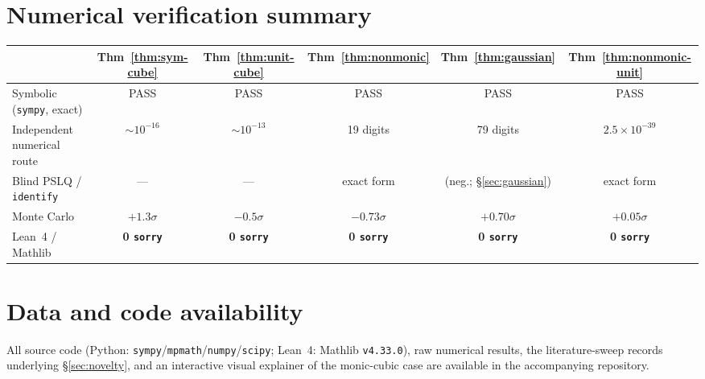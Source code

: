 \documentclass[11pt,reqno]{amsart}
\theoremstyle{plain}
\theoremstyle{remark}
\begin{document}
\appendix
\section{Numerical verification summary}

\begin{center}
\renewcommand{\arraystretch}{1.3}
\begin{tabular}{lccccc}
\hline
 & Thm~\ref{thm:sym-cube} & Thm~\ref{thm:unit-cube} & Thm~\ref{thm:nonmonic} & Thm~\ref{thm:gaussian} & Thm~\ref{thm:nonmonic-unit} \\
\hline
Symbolic (\texttt{sympy}, exact) & PASS & PASS & PASS & PASS & PASS \\
Independent numerical route & $\sim10^{-16}$ & $\sim10^{-13}$ & 19 digits & 79 digits & $2.5{\times}10^{-39}$ \\
Blind PSLQ / \texttt{identify} & --- & --- & exact form & (neg.; \S\ref{sec:gaussian}) & exact form \\
Monte Carlo & $+1.3\sigma$ & $-0.5\sigma$ & $-0.73\sigma$ & $+0.70\sigma$ & $+0.05\sigma$ \\
Lean~4 / Mathlib & \textbf{0 \texttt{sorry}} & \textbf{0 \texttt{sorry}} & \textbf{0 \texttt{sorry}} & \textbf{0 \texttt{sorry}} & \textbf{0 \texttt{sorry}} \\
\hline
\end{tabular}
\end{center}

\section*{Data and code availability}
All source code (Python: \texttt{sympy}/\texttt{mpmath}/\texttt{numpy}/\texttt{scipy};
Lean~4: Mathlib \texttt{v4.33.0}), raw numerical results, the literature-sweep
records underlying \S\ref{sec:novelty}, and an interactive visual explainer of
the monic-cubic case are available in the accompanying repository.
\end{document}
